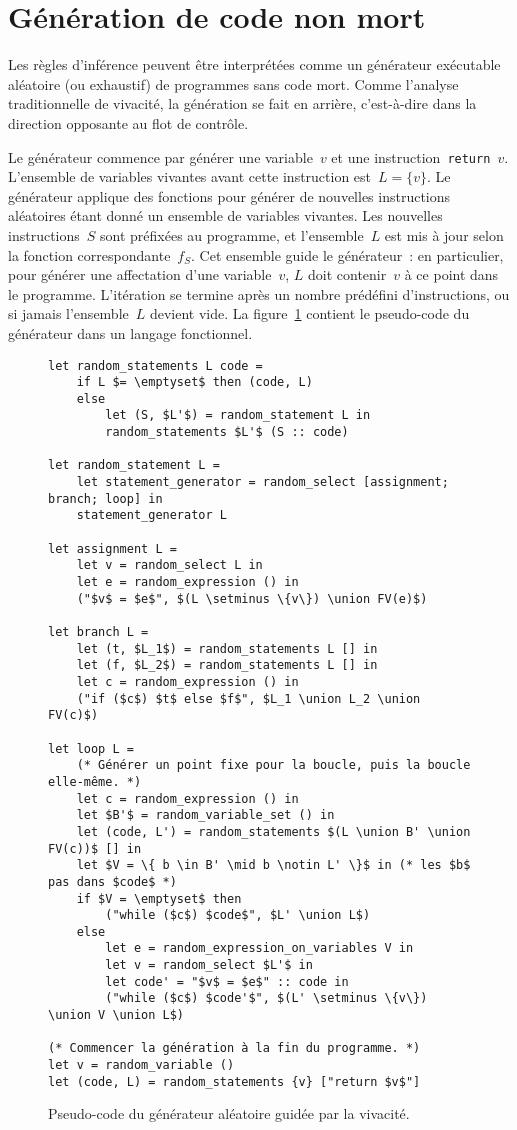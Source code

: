 \documentclass[a4paper]{easychair}
\def\union{\cup}
\begin{document}
\section{Génération de code non mort}

Les règles d'inférence peuvent être interprétées comme un générateur
exécutable aléatoire (ou exhaustif) de programmes sans code mort. Comme
l'analyse traditionnelle de vivacité, la génération se fait en arrière,
c'est-à-dire dans la direction opposante au flot de contrôle.

Le générateur commence par générer une variable~\(v\) et une
instruction~\texttt{return \(v\)}. L'ensemble de variables vivantes avant
cette instruction est~\(L = \{v\}\). Le générateur applique des fonctions
pour générer de nouvelles instructions aléatoires étant donné un ensemble
de variables vivantes. Les nouvelles instructions~\(S\) sont préfixées au
programme, et l'ensemble~\(L\) est mis à jour selon la fonction
correspondante~\(f_S\). Cet ensemble guide le générateur~: en particulier,
pour générer une affectation d'une variable~\(v\), \(L\) doit contenir~\(v\)
à ce point dans le programme. L'itération se termine après un nombre
prédéfini d'instructions, ou si jamais l'ensemble~\(L\) devient vide. La
figure~\ref{fig:generator} contient le pseudo-code du générateur dans un
langage fonctionnel.

\begin{figure}
\begin{lstlisting}
let random_statements L code =
    if L $= \emptyset$ then (code, L)
    else
        let (S, $L'$) = random_statement L in
        random_statements $L'$ (S :: code)

let random_statement L =
    let statement_generator = random_select [assignment; branch; loop] in
    statement_generator L

let assignment L =
    let v = random_select L in
    let e = random_expression () in
    ("$v$ = $e$", $(L \setminus \{v\}) \union FV(e)$)

let branch L =
    let (t, $L_1$) = random_statements L [] in
    let (f, $L_2$) = random_statements L [] in
    let c = random_expression () in
    ("if ($c$) $t$ else $f$", $L_1 \union L_2 \union FV(c)$)

let loop L =
    (* Générer un point fixe pour la boucle, puis la boucle elle-même. *)
    let c = random_expression () in
    let $B'$ = random_variable_set () in
    let (code, L') = random_statements $(L \union B' \union FV(c))$ [] in
    let $V = \{ b \in B' \mid b \notin L' \}$ in (* les $b$ pas dans $code$ *)
    if $V = \emptyset$ then
        ("while ($c$) $code$", $L' \union L$)
    else
        let e = random_expression_on_variables V in
        let v = random_select $L'$ in
        let code' = "$v$ = $e$" :: code in
        ("while ($c$) $code'$", $(L' \setminus \{v\}) \union V \union L$)

(* Commencer la génération à la fin du programme. *)
let v = random_variable ()
let (code, L) = random_statements {v} ["return $v$"]
\end{lstlisting}
\caption{Pseudo-code du générateur aléatoire guidée par la vivacité.}
\label{fig:generator}
\end{figure}
\end{document}
